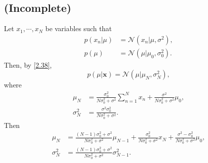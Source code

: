 \subsection{(Incomplete)}
\label{2.39}
Let $x_1, \cdots, x_N$ be variables such that
%
\begin{equation}
\begin{aligned}
p(x_n | \mu)
&=
\mathcal{N}
\left(
	x_n
	|
	\mu,
	\sigma ^ 2	
\right),
\\
p(\mu)
&=
\mathcal{N}
\left(
	\mu
	|
	\mu_0,
	\sigma_0 ^ 2	
\right).
\end{aligned}
\end{equation}
%
Then, by \ref{2.38},
%
\begin{equation}
p(\mu | \mathbf{x})
= 
\mathcal{N}
\left( 
	\mu
	|
	\mu_N,
	\sigma_N ^ 2
\right),
\end{equation}
%
where
%
\begin{equation}
\begin{aligned}
\mu_N
&= 
\frac{\sigma_0 ^ 2}{N \sigma_0 ^ 2 + \sigma ^ 2} 
\sum_{n = 1}^{N}
x_n
+
\frac{\sigma ^ 2}{N \sigma_0 ^ 2 + \sigma ^ 2} 
\mu_0,
\\
\sigma_N ^ 2
&= 
\frac{\sigma ^ 2 \sigma_0 ^ 2}{N \sigma_0 ^ 2 + \sigma ^ 2}.
\end{aligned}
\end{equation}
%
Then
%
\begin{equation}
\begin{aligned}
\mu_N
&= 
\frac{(N - 1) \sigma_0 ^ 2 + \sigma ^ 2}{N \sigma_0 ^ 2 + \sigma ^ 2}
\mu_{N - 1}
+
\frac{\sigma_0 ^ 2}{N \sigma_0 ^ 2 + \sigma ^ 2}
x_{N}
+
\frac{\sigma ^ 2 - \sigma_0 ^ 2}{N \sigma_0 ^ 2 + \sigma ^ 2} 
\mu_0,
\\
\sigma_N ^ 2
&= 
\frac{(N - 1) \sigma_0 ^ 2 + \sigma ^ 2}{N \sigma_0 ^ 2 + \sigma ^ 2} 
\sigma_{N - 1} ^ 2.
\end{aligned}
\end{equation}
%

